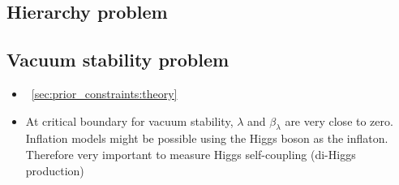 
\subsection{Hierarchy problem}

\subsection{Vacuum stability problem}
\begin{itemize}
	\item \Section~\ref{sec:prior_constraints:theory}
	\item At critical boundary for vacuum stability, $\lambda$ and $\beta_{\lambda}$ are very close to zero. Inflation models might be possible using the Higgs boson as the inflaton. Therefore very important to measure Higgs self-coupling (\eg di-Higgs production)
\end{itemize}